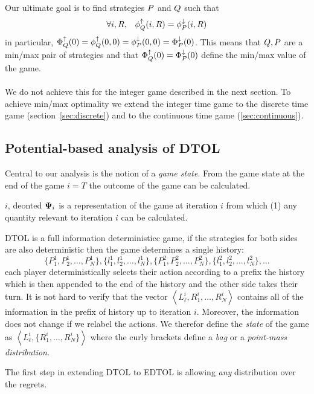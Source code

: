 \documentclass{article}[12pt]
\begin{document}
Our ultimate goal is to find strategies $P$ and
$Q$ such that
\begin{equation} \label{eqn:limitPotential}
\forall i,R,\;\;\; \phi_{Q}^{\uparrow}(i,R) = \phi_{P}^{\downarrow}(i,R)
\end{equation}
in particular, $\Phi_{Q}^{\uparrow}(0)=\phi_{Q}^{\uparrow}(0,0) =
\phi_{P}^{\downarrow}(0,0)=\Phi_{P}^{\downarrow}(0)$. This means that
$Q,P$ are a min/max pair of strategies and that
$\Phi_{Q}^{\uparrow}(0)=\Phi_{P}^{\downarrow}(0)$ define the min/max value of the game.
~\\~\\
We do not achieve this for the integer game described in the next
section. To achieve min/max optimality we extend the integer time game
to the discrete time game (section~\ref{sec:discrete}) and to the
continuous time game (\ref{sec:continuous}).

\subsection{Potential-based analysis of DTOL}


Central to our analysis is the notion of a {\em game state}. From the game
state at the end of the game $i=T$ the outcome of the game can be calculated.



$i$, deonted ${\bf \Psi}_i$ is a representation of the game at iteration $i$ from which (1) any quantity relevant to iteration $i$ can be calculated.



DTOL is a full information deterministicc game, if the strategies for
both sides are also deterministic then the game determines a single history:
\[
  \{P^1_1,P^1_2,\ldots,P^1_N\},\{l^1_1,l^1_2,\ldots,l_N^1\},
  \{P^2_1,P^2_2,\ldots,P^2_N\},\{l^2_1,l^2_2,\ldots,l_N^2\},\ldots 
\]
each player deterministically selects their action according to a
prefix the history which is then appended to the end of the history
and the other side takes their turn.  It is not hard to verify that
the vector $\left\langle L^i_\ell,R_1^i,\ldots,R_N^i \right\rangle$
contains all of the information in the prefix of history up to
iteration $i$. Moreover, the information does not change if we relabel
the actions.  We therefor define the {\em state} of the game as
$\left\langle L^i_\ell, \{R_1^i,\ldots,R_N^i\} \right\rangle$ where the curly brackets define a {\em bag} or a {\em point-mass distribution}.

The first step in extending DTOL to EDTOL is allowing {\em any}
distribution over the regrets.
\end{document}
